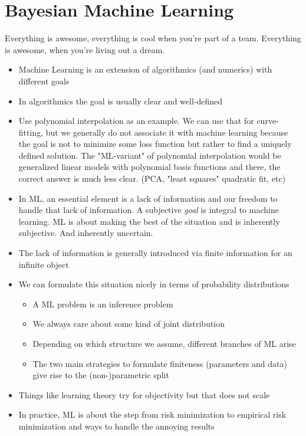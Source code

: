 \chapter{Bayesian Machine Learning}
\label{toc:bayesian_ml}
Everything is awesome, everything is cool when you're part of a team.
Everything is awesome, when you're living out a dream.

\begin{itemize}
    \item Machine Learning is an extension of algorithmics (and numerics) with different goals
    \item In algorithmics the goal is usually clear and well-defined
    \item Use polynomial interpolation as an example.
          We can use that for curve-fitting, but we generally do not associate it with machine learning because the goal is not to minimize some loss function but rather to find a uniquely defined solution.
          The "ML-variant" of polynomial interpolation would be generalized linear models with polynomial basis functions and there, the correct answer is much less clear. (PCA, "least squares" quadratic fit, etc)
    \item In ML, an essential element is a lack of information and our freedom to handle that lack of information. A subjective \emph{goal} is integral to machine learning. ML is about making the best of the situation and is inherently subjective. And inherently uncertain.
    \item The lack of information is generally introduced via finite information for an infinite object
    \item We can formulate this situation nicely in terms of probability distributions
          \begin{itemize}
              \item A ML problem is an inference problem
              \item We always care about some kind of joint distribution
              \item Depending on which structure we assume, different branches of ML arise
              \item The two main strategies to formulate finiteness (parameters and data) give rise to the (non-)parametric split
          \end{itemize}
    \item Things like learning theory try for objectivity but that does not scale
    \item In practice, ML is about the step from risk minimization to empirical risk minimization and ways to handle the annoying results

\end{itemize}
